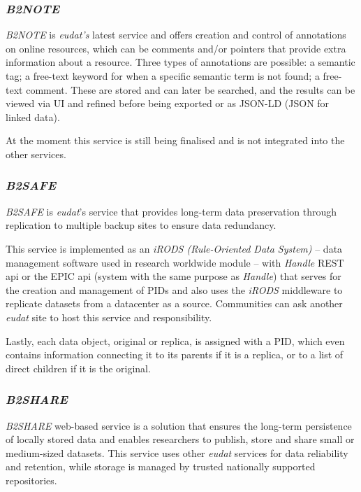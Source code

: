 \subsubsection{\textit{B2NOTE}}
  
\textit{B2NOTE} is \textit{\gls{eudat}'s} latest service and offers creation and control of annotations on online resources, which can be comments and/or pointers that provide extra information about a resource.
Three types of annotations are possible: a semantic tag; a free-text keyword for when a specific semantic term is not found; a free-text comment. These are stored and can later be searched, and the results can be viewed via UI and refined before being exported or as JSON-LD (JSON for linked data).

At the moment this service is still being finalised and is not integrated into the other services.

\subsubsection{\textit{B2SAFE}}
  
\textit{B2SAFE} is \textit{\gls{eudat}}'s service that provides long-term data preservation through replication to multiple backup sites to ensure data redundancy.
  
This service is implemented as an \textit{iRODS (Rule-Oriented Data System)} -- data management software used in research worldwide module -- with \textit{Handle} REST \gls{api} or the EPIC \gls{api} (system with the same purpose as \textit{Handle}) that serves for the creation and management of PIDs and also uses the \textit{iRODS} middleware to replicate datasets from a datacenter as a source. Communities can ask another \textit{\gls{eudat}} site to host this service and responsibility. 
  
Lastly, each data object, original or replica, is assigned with a PID, which even contains information connecting it to its parents if it is a replica, or to a list of direct children if it is the original.
    
\subsubsection{\textit{B2SHARE}}
  
\textit{B2SHARE} web-based service is a solution that ensures the long-term persistence of locally stored data and enables researchers to publish, store and share small or medium-sized datasets. This service uses other \textit{\gls{eudat}} services for data reliability and retention, while storage is managed by trusted nationally supported repositories.
   
